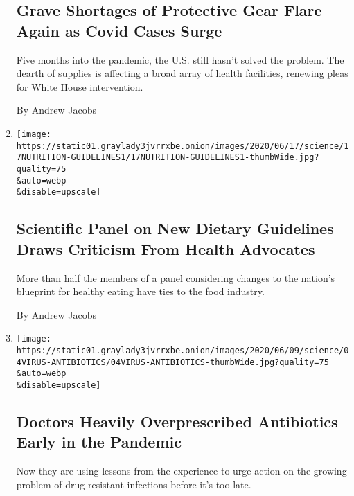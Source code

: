 \begin{enumerate}
  \hypertarget{grave-shortages-of-protective-gear-flare-again-as-covid-cases-surge}{%
  \subsection{Grave Shortages of Protective Gear Flare Again as Covid
  Cases
  Surge}\label{grave-shortages-of-protective-gear-flare-again-as-covid-cases-surge}}

  Five months into the pandemic, the U.S. still hasn't solved the
  problem. The dearth of supplies is affecting a broad array of health
  facilities, renewing pleas for White House intervention.

  By Andrew Jacobs
\item
  \href{/2020/06/17/health/diet-nutrition-guidelines.html}{}

  \texttt{[image: https://static01.graylady3jvrrxbe.onion/images/2020/06/17/science/17NUTRITION-GUIDELINES1/17NUTRITION-GUIDELINES1-thumbWide.jpg?quality=75\\\&auto=webp\\\&disable=upscale]}

  \hypertarget{scientific-panel-on-new-dietary-guidelines-draws-criticism-from-health-advocates}{%
  \subsection{Scientific Panel on New Dietary Guidelines Draws Criticism
  From Health
  Advocates}\label{scientific-panel-on-new-dietary-guidelines-draws-criticism-from-health-advocates}}

  More than half the members of a panel considering changes to the
  nation's blueprint for healthy eating have ties to the food industry.

  By Andrew Jacobs
\item
  \href{/2020/06/04/health/coronavirus-antibiotics-drugs.html}{}

  \texttt{[image: https://static01.graylady3jvrrxbe.onion/images/2020/06/09/science/04VIRUS-ANTIBIOTICS/04VIRUS-ANTIBIOTICS-thumbWide.jpg?quality=75\\\&auto=webp\\\&disable=upscale]}

  \hypertarget{doctors-heavily-overprescribed-antibiotics-early-in-the-pandemic}{%
  \subsection{Doctors Heavily Overprescribed Antibiotics Early in the
  Pandemic}\label{doctors-heavily-overprescribed-antibiotics-early-in-the-pandemic}}

  Now they are using lessons from the experience to urge action on the
  growing problem of drug-resistant infections before it's too late.


\end{enumerate}
